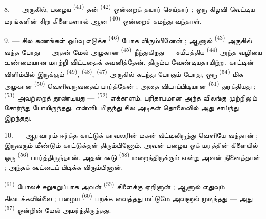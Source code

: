 8. --- அருகில், பழைய  \textsuperscript{(41)} தன்
 \textsuperscript{(42)} ஒன்றைத்
தயார் செய்தார் ; ஒரு கிழவி வெட்டிய மரங்களின் சிறு கிளைகளால் ஆன
  \textsuperscript{(40)} ஒன்றைச்
சுமந்து வந்தாள்.

\VUsaut{3.0mm}
\VUsaut{3.0mm}

9. --- சில கணங்கள் ஓய்வு எடுக்க 
\textsuperscript{(46)} போக விரும்பினேன் ; ஆனால் 
\textsuperscript{(43)} அருகில் வந்த போது — அதன் மேல் அழகான
 \textsuperscript{(45)} நீந்துகிறது — சமீபத்திய
 \textsuperscript{(44)} அந்த வழியை உண்மையான
 மாற்றி விட்டதைக் கவனித்தேன். திரும்ப வேண்டியதாயிற்று.
காட்டின் விளிம்பில் இருக்கும் 
\textsuperscript{(49)}, 
\textsuperscript{(48)}, 
\textsuperscript{(47)} அருகில் கடந்து போகும் போது, ஒரு  \textsuperscript{(54)} மிக அழகான 
\textsuperscript{(50)} வெளிவருவதைப் பார்த்தேன் ; அதை விடாப்பிடியான
 \textsuperscript{(51)} துரத்தியது ;
 \textsuperscript{(53)} அவற்றைத் தூண்டியது —
 \textsuperscript{(52)}
எக்காளம்.
பரிதாபமான அந்த விலங்கு முற்றிலும் சோர்ந்து போயிருந்தது. என்னிடமிருந்து
சில அடிகள் தொலைவில் அது சாய்ந்து இறந்தது.

10. ---  ஆரவாரம் ஈர்த்த காட்டுக்
காவலரின் மகன் வீட்டிலிருந்து வெளியே வந்தான் ; இருவரும் மீண்டும்
காட்டுக்குள் திரும்பினோம். அவன் பழைய ஓக் மரத்தின் கிளையில் ஒரு
 \textsuperscript{(56)} பார்த்திருந்தான். அதன் கூடு
 \textsuperscript{(58)} மறைந்திருக்கும் என்று
அவன் நினைத்தான் ; அந்தக் கூட்டைப் பிடிக்க விரும்பினான்.

 \textsuperscript{(61)} போலச் சுறுசுறுப்பாக அவன்
 \textsuperscript{(55)} கிளைக்கு ஏறினான் ; ஆனால்
எதுவும் கிடைக்கவில்லை ; பழைய  \textsuperscript{(60)}
பறக்க வைத்தது மட்டுமே அவனால் முடிந்தது — அது 
\textsuperscript{(57)} ஒன்றின் மேல் அமர்ந்திருந்தது.

\VUsaut{4.0mm}
\VUfilet{22mm}
